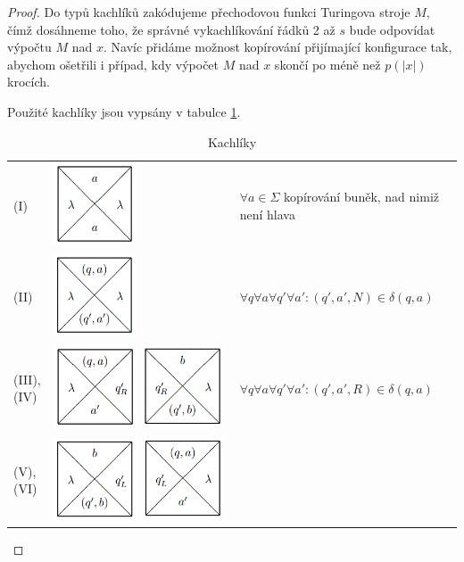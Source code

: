 \documentclass[11pt]{report} %
\begin{document}
\begin{proof}
Do typů kachlíků zakódujeme přechodovou funkci Turingova stroje $M$, čímž dosáhneme toho, že správné vykachlíkování řádků 2 až $s$ bude odpovídat výpočtu $M$ nad $x$. Navíc přidáme možnost kopírování přijímající konfigurace tak, abychom ošetřili i případ, kdy výpočet $M$ nad $x$ skončí po méně než $p(|x|)$ krocích.

Použité kachlíky jsou vypsány v tabulce \ref{kachliky}.

\begin{table}[H]
	\centering
	\caption{Kachlíky}
	\label{kachliky}
	\renewcommand{\arraystretch}{1.5}
	\begin{tabular}{| m{0.05\linewidth}  m{0.45\linewidth} | m{0.5\linewidth}| }
		\hline
		(I) & \smallskip\includegraphics[width=70pt]{img/kachl1.png} 
		& $\forall a \in \Sigma$ kopírování buněk, nad nimiž není hlava\\ 
		(II) & \includegraphics[width=70pt]{img/kachl2.png} 
		& $\forall q \forall a \forall q' \forall a' : (q',a',N) \in \delta(q,a)$\\ 
		(III), (IV) & \includegraphics[width=70pt]{img/kachl3.png} \includegraphics[width=70pt]{img/kachl4.png} 
		& $\forall q \forall a \forall q' \forall a' : (q',a',R) \in \delta(q,a)$\\
		(V), (VI) & \includegraphics[width=70pt]{img/kachl5.png} \includegraphics[width=70pt]{img/kachl6.png} 

\end{tabular}
\end{table}
\end{proof}
\end{document}
